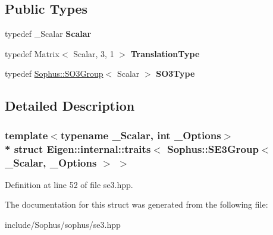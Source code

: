 \subsection*{Public Types}
\begin{DoxyCompactItemize}
\item 
typedef \+\_\+\+Scalar {\bfseries Scalar}\hypertarget{struct_eigen_1_1internal_1_1traits_3_01_sophus_1_1_s_e3_group_3_01___scalar_00_01___options_01_4_01_4_a14579916ade4d76c6bd4ae6616f964eb}{}\label{struct_eigen_1_1internal_1_1traits_3_01_sophus_1_1_s_e3_group_3_01___scalar_00_01___options_01_4_01_4_a14579916ade4d76c6bd4ae6616f964eb}

\item 
typedef Matrix$<$ Scalar, 3, 1 $>$ {\bfseries Translation\+Type}\hypertarget{struct_eigen_1_1internal_1_1traits_3_01_sophus_1_1_s_e3_group_3_01___scalar_00_01___options_01_4_01_4_a4e495364f43038efc48b8d42bb799e37}{}\label{struct_eigen_1_1internal_1_1traits_3_01_sophus_1_1_s_e3_group_3_01___scalar_00_01___options_01_4_01_4_a4e495364f43038efc48b8d42bb799e37}

\item 
typedef \hyperlink{class_sophus_1_1_s_o3_group}{Sophus\+::\+S\+O3\+Group}$<$ Scalar $>$ {\bfseries S\+O3\+Type}\hypertarget{struct_eigen_1_1internal_1_1traits_3_01_sophus_1_1_s_e3_group_3_01___scalar_00_01___options_01_4_01_4_a4fdc8aa587c44cb43db8211ee1105a23}{}\label{struct_eigen_1_1internal_1_1traits_3_01_sophus_1_1_s_e3_group_3_01___scalar_00_01___options_01_4_01_4_a4fdc8aa587c44cb43db8211ee1105a23}

\end{DoxyCompactItemize}


\subsection{Detailed Description}
\subsubsection*{template$<$typename \+\_\+\+Scalar, int \+\_\+\+Options$>$\\*
struct Eigen\+::internal\+::traits$<$ Sophus\+::\+S\+E3\+Group$<$ \+\_\+\+Scalar, \+\_\+\+Options $>$ $>$}



Definition at line 52 of file se3.\+hpp.



The documentation for this struct was generated from the following file\+:\begin{DoxyCompactItemize}
\item 
include/\+Sophus/sophus/se3.\+hpp\end{DoxyCompactItemize}
